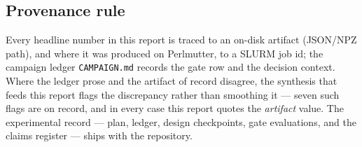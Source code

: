 \subsection{Provenance rule}

Every headline number in this report is traced to an on-disk artifact
(JSON/NPZ path), and where it was produced on Perlmutter, to a SLURM job
id; the campaign ledger \texttt{CAMPAIGN.md} records the gate row and the
decision context. Where the ledger prose and the artifact of record
disagree, the synthesis that feeds this report flags the discrepancy
rather than smoothing it --- seven such flags are on record, and in every
case this report quotes the \emph{artifact}
value. The
experimental record --- plan, ledger, design checkpoints, gate
evaluations, and the claims register --- ships with the repository.

